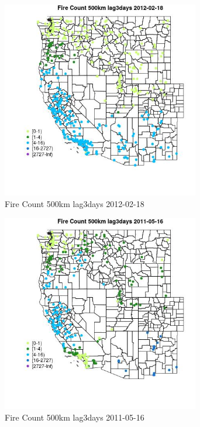 \begin{figure} 
\centering  
\includegraphics[width=0.77\textwidth]{Code_Outputs/Report_ML_input_PM25_Step4_part_f_de_duplicated_aves_prioritize_24hr_obswNAs_MapObsFire_Count_500km_lag3days2012-02-18.jpg} 
\caption{\label{fig:Report_ML_input_PM25_Step4_part_f_de_duplicated_aves_prioritize_24hr_obswNAsMapObsFire_Count_500km_lag3days2012-02-18}Fire Count 500km lag3days 2012-02-18} 
\end{figure} 
 

\clearpage 

\begin{figure} 
\centering  
\includegraphics[width=0.77\textwidth]{Code_Outputs/Report_ML_input_PM25_Step4_part_f_de_duplicated_aves_prioritize_24hr_obswNAs_MapObsFire_Count_500km_lag3days2011-05-16.jpg} 
\caption{\label{fig:Report_ML_input_PM25_Step4_part_f_de_duplicated_aves_prioritize_24hr_obswNAsMapObsFire_Count_500km_lag3days2011-05-16}Fire Count 500km lag3days 2011-05-16} 
\end{figure} 
 


